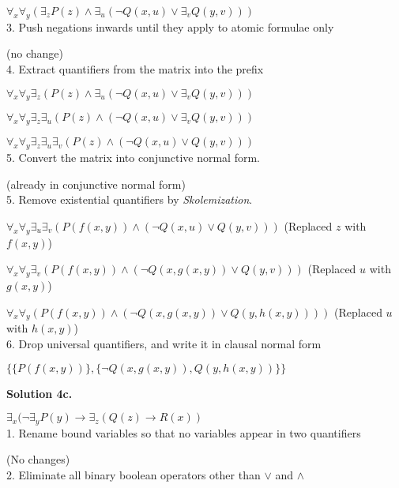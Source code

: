 \documentclass{article}
\newcommand{\tOne}{7.5cm}
\begin{document}
{$\forall_x\forall_y(\exists_zP(z) \wedge \exists_u(\neg{Q(x, u)} \vee \exists_vQ(y, v)))$\\

3. Push negations inwards until they apply to atomic formulae only

(no change)\\

4. Extract quantifiers from the matrix into the prefix

$\forall_x\forall_y\exists_z(P(z) \wedge \exists_u(\neg{Q(x, u)} \vee \exists_vQ(y, v)))$

$\forall_x\forall_y\exists_z\exists_u(P(z) \wedge (\neg{Q(x, u)} \vee \exists_vQ(y, v)))$

$\forall_x\forall_y\exists_z\exists_u\exists_v(P(z) \wedge (\neg{Q(x, u)} \vee Q(y, v)))$\\

5. Convert the matrix into conjunctive normal form.

(already in conjunctive normal form)\\

5. Remove existential quantifiers by \emph{Skolemization}.

$\forall_x\forall_y\exists_u\exists_v(P(f(x, y)) \wedge (\neg{Q(x, u)} \vee Q(y, v)))$ \tabto{\tOne}(Replaced $z$ with $f(x, y)$)

$\forall_x\forall_y\exists_v(P(f(x, y)) \wedge (\neg{Q(x, g(x, y))} \vee Q(y, v)))$ \tabto{\tOne}(Replaced $u$ with $g(x, y)$)

$\forall_x\forall_y(P(f(x, y)) \wedge (\neg{Q(x, g(x, y))} \vee Q(y, h(x, y))))$ \tabto{\tOne}(Replaced $u$ with $h(x, y)$)\\

6. Drop universal quantifiers, and write it in clausal normal form

$\{\{P(f(x, y))\}, \{\neg{Q(x, g(x, y))}, Q(y, h(x, y))\}\}$\\


\pagebreak

\textbf{\large{Solution 4c.}}

$\exists_x(\neg\exists_yP(y) \rightarrow \exists_z(Q(z) \rightarrow R(x))$\\

1. Rename bound variables so that no variables appear in two quantifiers

(No changes)\\

2. Eliminate all binary boolean operators other than $\vee$ and $\wedge$

}
\end{document}
